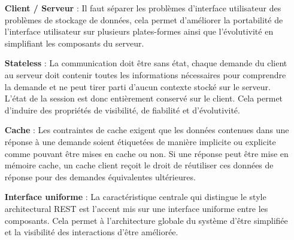 \begin{itemize}

    \item [\textbf{Client / Serveur}] :
    \newline
    Il faut séparer les problèmes d’interface utilisateur des problèmes de stockage de données, cela permet d'améliorer la portabilité de l'interface utilisateur sur plusieurs plates-formes ainsi que l’évolutivité en simplifiant les composants du serveur.\newline

    \item [\textbf{Stateless}] :
    \newline
    La communication doit être sans état, chaque demande du client au serveur doit contenir toutes les informations nécessaires pour comprendre la demande et ne peut tirer parti d'aucun contexte stocké sur le serveur. L'état de la session est donc entièrement conservé sur le client. Cela permet d'induire des propriétés de visibilité, de fiabilité et d'évolutivité.\newline

    \item [\textbf{Cache}] :
    \newline
    Les contraintes de cache exigent que les données contenues dans une réponse à une demande soient étiquetées de manière implicite ou explicite comme pouvant être mises en cache ou non. Si une réponse peut être mise en mémoire cache, un cache client reçoit le droit de réutiliser ces données de réponse pour des demandes équivalentes ultérieures.\newline

    \item [\textbf{Interface uniforme}] :
    \newline
    La caractéristique centrale qui distingue le style architectural REST est l'accent mis sur une interface uniforme entre les composants. Cela permet à l'architecture globale du système d'être simplifiée et la visibilité des interactions d'être améliorée.\newline


\end{itemize}

